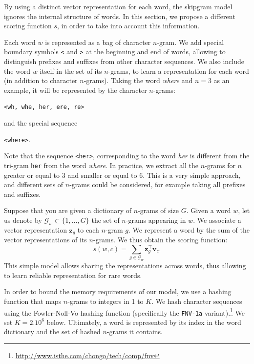 By using a distinct vector representation for each word, the skipgram model ignores the internal structure of words.
In this section, we propose a different scoring function $s$, in order to take into account this information.

Each word $w$ is represented as a bag of character $n$-gram.
We add special boundary symbols \texttt{<} and \texttt{>} at the beginning and end of words, allowing to distinguish prefixes and suffixes from other character sequences.
We also include the word $w$ itself in the set of its $n$-grams, to learn a representation for each word (in addition to character $n$-grams).
Taking the word \emph{where} and $n=3$ as an example, it will be represented by the character $n$-grams:
\begin{center}
\texttt{<wh, whe, her, ere, re>}
\end{center}
and the special sequence
\begin{center}
\texttt{<where>}.
\end{center}
Note that the sequence \texttt{<her>}, corresponding to the word \emph{her} is different from the tri-gram \texttt{her} from the word \emph{where}.
In practice, we extract all the $n$-grams for $n$ greater or equal to 3 and smaller or equal to $6$.
This is a very simple approach, and different sets of $n$-grams could be considered, for example taking all prefixes and suffixes.

Suppose that you are given a dictionary of $n$-grams of size $G$.
Given a word $w$, let us denote by $\mathcal{G}_w \subset \{1, \dots, G \}$ the set of $n$-grams appearing in $w$.
We associate a vector representation $\mathbf{z}_g$ to each $n$-gram $g$.
We represent a word by the sum of the vector representations of its $n$-grams.
We thus obtain the scoring function:
\begin{equation*}
s(w, c) = \sum_{g \in \mathcal{G}_w} \mathbf{z}_g^\top \mathbf{v}_c.
\end{equation*}
This simple model allows sharing the representations across words, thus allowing to learn reliable representation for rare words.

In order to bound the memory requirements of our model, we use a hashing function that maps $n$-grams to integers in 1 to $K$.
We hash character sequences using the Fowler-Noll-Vo hashing function (specifically the \texttt{FNV-1a} variant).\footnote{\smaller\relax\url{http://www.isthe.com/chongo/tech/comp/fnv}}
We set $K = 2.10^6$ below.
Ultimately, a word is represented by its index in the word dictionary and the set of hashed $n$-grams it contains.





